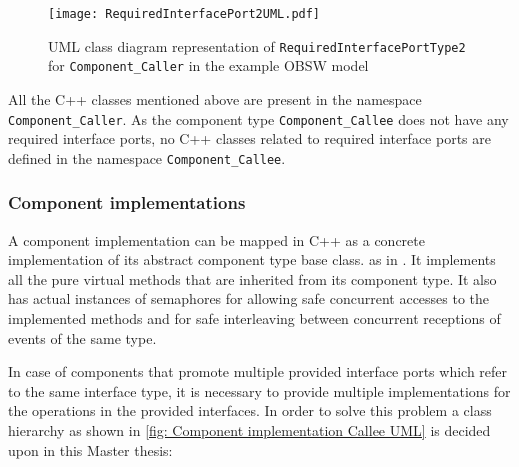 \begin{figure}[h]
	\centering
	\texttt{[image: RequiredInterfacePort2UML.pdf]}
	\caption{UML class diagram representation of \texttt{Required\allowbreak InterfacePort\allowbreak Type2} for \texttt{Component\allowbreak\_Caller} in the example OBSW model}
	\label{fig: Required interface port2 UML}
\end{figure}

All the C++ classes mentioned above are present in the namespace \texttt{Component\allowbreak\_Caller}. As the component type \texttt{Component\allowbreak\_Callee} does not have any required interface ports, no C++ classes related to required interface ports are defined in the namespace \texttt{Component\allowbreak\_Callee}. 

\subsubsection{\textbf{Component implementations}}
A component implementation can be mapped in C++ as a concrete implementation of its abstract component type base class. as in \cite{EvoRAVCodeAr}. It implements all the pure virtual methods that are inherited from its component type. It also has actual instances of semaphores for allowing safe concurrent accesses to the implemented methods and for safe interleaving between concurrent receptions of events of the same type.

In case of components that promote multiple provided interface ports which refer to the same interface type, it is necessary to provide multiple implementations for the operations in the provided interfaces. In order to solve this problem a class hierarchy as shown in \cref{fig: Component implementation Callee UML} is decided upon in this Master thesis:


